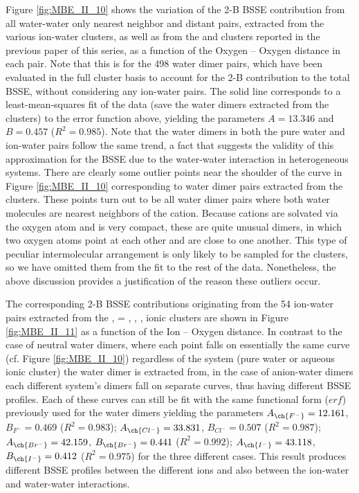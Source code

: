 \documentclass[11pt, proquest]{uwthesis}[2020/02/24]
\let\ce\ch
\begin{document}
\par Figure \ref{fig:MBE_II_10} shows the variation of the 2-B BSSE contribution from all water-water only nearest neighbor and distant pairs, extracted from the various ion-water clusters, as well as from the \ce{(H2O)7} and \ce{(H2O)_{10}} clusters reported in the previous paper of this series,\autocite{heindel_many-body_2020} as a function of the Oxygen – Oxygen distance in each pair. Note that this is for the 498 water dimer pairs, which have been evaluated in the full cluster basis to account for the 2-B contribution to the total BSSE, without considering any ion-water pairs. The solid line corresponds to a least-mean-squares fit of the data (save the water dimers extracted from the \ce{Li^+(H2O)9} clusters) to the error function above, yielding the parameters $A = 13.346$ and $B = 0.457$ ($R^2 = 0.985$). Note that the water dimers in both the pure water and ion-water pairs follow the same trend, a fact that suggests the validity of this approximation for the BSSE due to the water-water interaction in heterogeneous systems. There are clearly some outlier points near the shoulder of the curve in Figure \ref{fig:MBE_II_10} corresponding to water dimer pairs extracted from the \ce{Li^+(H2O)9} clusters. These points turn out to be all water dimer pairs where both water molecules are nearest neighbors of the \ce{Li^+} cation. Because cations are solvated via the oxygen atom and \ce{Li^+} is very compact, these are quite unusual dimers, in which two oxygen atoms point at each other and are close to one another. This type of peculiar intermolecular arrangement is only likely to be sampled for the \ce{Li^+(H2O)9} clusters, so we have omitted them from the fit to the rest of the data. Nonetheless, the above discussion provides a justification of the reason these outliers occur.



\par The corresponding 2-B BSSE contributions originating from the 54 ion-water pairs extracted from the \ce{Z^-(H2O)9}, \ce{Z} = \ce{Cl^-}, \ce{Br^-}, \ce{I^-}, ionic clusters are shown in Figure \ref{fig:MBE_II_11} as a function of the Ion – Oxygen distance. In contrast to the case of neutral water dimers, where each point falls on essentially the same curve (cf. Figure \ref{fig:MBE_II_10}) regardless of the system (pure water or aqueous ionic cluster) the water dimer is extracted from, in the case of anion-water dimers each different system’s dimers fall on separate curves, thus having different BSSE profiles. Each of these curves can still be fit with the same functional form ($erf$) previously used for the water dimers yielding the parameters $A_{\ce{F^-}}=12.161$, $B_{F^-}=0.469$ ($R^2=0.983$); $A_{\ce{Cl^-}}=33.831$, $B_{Cl^-}=0.507$ ($R^2 = 0.987$); $A_{\ce{Br^-}}=42.159$, $B_{\ce{Br^-}}=0.441$ ($R^2 = 0.992$); $A_{\ce{I^-}}=43.118$, $B_{\ce{I^-}}=0.412$ ($R^2 = 0.975$) for the three different cases. This result produces different BSSE profiles between the different ions and also between the ion-water and water-water interactions.
\end{document}
